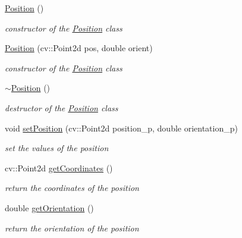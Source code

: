 \begin{DoxyCompactItemize}
\item 
\mbox{\label{class_path2_d_1_1_element_1_1_position_aaa51dab67a1ef0a93f81f3357b07c403}} 
\mbox{\hyperlink{class_path2_d_1_1_element_1_1_position_aaa51dab67a1ef0a93f81f3357b07c403}{Position}} ()
\begin{DoxyCompactList}\small\item\em constructor of the \mbox{\hyperlink{class_path2_d_1_1_element_1_1_position}{Position}} class \end{DoxyCompactList}\item 
\mbox{\hyperlink{class_path2_d_1_1_element_1_1_position_ad8dafce9ad9442b93ebdb0d991f3b945}{Position}} (cv\+::\+Point2d pos, double orient)
\begin{DoxyCompactList}\small\item\em constructor of the \mbox{\hyperlink{class_path2_d_1_1_element_1_1_position}{Position}} class \end{DoxyCompactList}\item 
\mbox{\label{class_path2_d_1_1_element_1_1_position_afd71b265ceb967ee9877bd45abc06a9a}} 
\mbox{\hyperlink{class_path2_d_1_1_element_1_1_position_afd71b265ceb967ee9877bd45abc06a9a}{$\sim$\+Position}} ()
\begin{DoxyCompactList}\small\item\em destructor of the \mbox{\hyperlink{class_path2_d_1_1_element_1_1_position}{Position}} class \end{DoxyCompactList}\item 
void \mbox{\hyperlink{class_path2_d_1_1_element_1_1_position_ab0687fa319178000f2ee1f2d06e7c0df}{set\+Position}} (cv\+::\+Point2d position\+\_\+p, double orientation\+\_\+p)
\begin{DoxyCompactList}\small\item\em set the values of the position \end{DoxyCompactList}\item 
cv\+::\+Point2d \mbox{\hyperlink{class_path2_d_1_1_element_1_1_position_a02a5b758165848fe2f6a69e46904307f}{get\+Coordinates}} ()
\begin{DoxyCompactList}\small\item\em return the coordinates of the position \end{DoxyCompactList}\item 
double \mbox{\hyperlink{class_path2_d_1_1_element_1_1_position_ab40fecf77143ee106cbe1aa43d07a09d}{get\+Orientation}} ()
\begin{DoxyCompactList}\small\item\em return the orientation of the position \end{DoxyCompactList}\end{DoxyCompactItemize}
